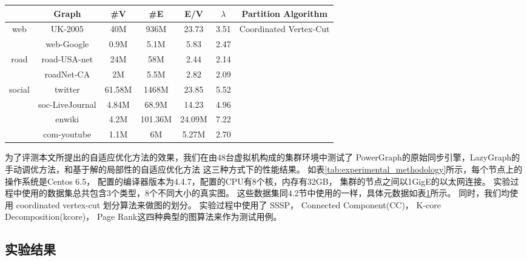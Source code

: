 \begin{table}[htb]
  \centering
  \label{tab:experimental_data_set_and_partition_algorithm}
    \begin{tabular}{ccccccc}
     \toprule[1.5pt]
     & \textbf{Graph} & \textbf{\#V} & \textbf{\#E} & \textbf{E/V} & \textbf{$\lambda$} & {\textbf{Partition Algorithm}} \\
     \midrule[1pt]
     \multirow{2}{*}{web} & UK-2005 & 40M & 936M & 23.73 & 3.51 & \multirow{8}{*}{Coordinated Vertex-Cut } \\
                                         & web-Google & 0.9M & 5.1M & 5.83 & 2.47 \\
     \cmidrule(lr){1-6}
      \multirow{2}{*}{road} & road-USA-net & 24M & 58M & 2.44 & 2.14 \\
                                          & roadNet-CA & 2M & 5.5M & 2.82 & 2.09 \\
      \cmidrule(lr){1-6}
      \multirow{4}{*}{social} & twitter & 61.58M & 1468M & 23.85 & 5.52 \\
                                          & soc-LiveJournal & 4.84M & 68.9M & 14.23 & 4.96 \\
                                          & enwiki & 4.2M & 101.36M & 24.09M & 7.22 \\
                                          & com-youtube & 1.1M & 6M & 5.27M & 2.70 \\
     \bottomrule[1.5pt]
    \end{tabular}
\end{table}

为了评测本文所提出的自适应优化方法的效果，我们在由48台虚拟机构成的集群环境中测试了
PowerGraph的原始同步引擎，LazyGraph的手动调优方法，和基于解的局部性的自适应优化方法
这三种方式下的性能结果。
如表\ref{tab:experimental_methodology}所示，每个节点上的操作系统是Centos 6.5，
配置的编译器版本为4.4.7，配置的CPU有8个核，内存有32GB，
集群的节点之间以1GigE的以太网连接。
实验过程中使用的数据集总共包含3个类型，8个不同大小的真实图。
这些数据集同4.2节中使用的一样，具体元数据如表\ref{tab:experimental_data_set_and_partition_algorithm}所示。
同时，我们均使用 coordinated vertex-cut 划分算法来做图的划分。
实验过程中使用了
SSSP， 
Connected Component(CC)，
K-core Decomposition(kcore)， 
Page Rank这四种典型的图算法来作为测试用例。


\subsection{实验结果}

